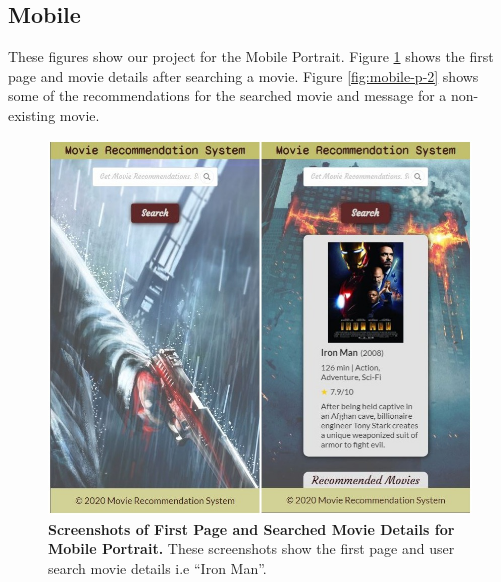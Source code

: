 \subsection{Mobile}

These figures show our project for the Mobile Portrait. Figure \ref{fig:mobile-p-1} shows the first page and movie details after searching a movie. Figure \ref{fig:mobile-p-2} shows some of the recommendations for the searched movie and message for a non-existing movie.

\begin{figure}[ht]
	\centering
  	\includegraphics[width=1.0\textwidth]{images/mobile_p_1.JPG}
	\caption{\textbf{Screenshots of First Page and Searched Movie Details for Mobile Portrait.} These screenshots show the first page and user search movie details i.e “Iron Man”.}
  	\label{fig:mobile-p-1}
\end{figure}

